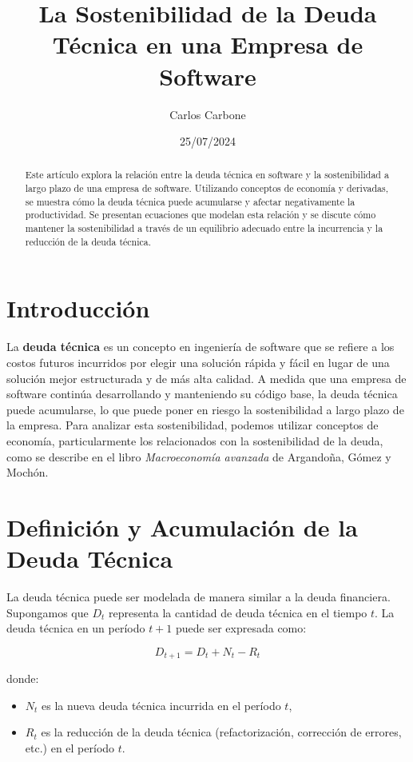 \documentclass[12pt]{article}
\title{La Sostenibilidad de la Deuda Técnica en una Empresa de Software}
\author{Carlos Carbone}
\date{25/07/2024}
\begin{document}
\maketitle

\begin{abstract}
Este artículo explora la relación entre la deuda técnica en software y la sostenibilidad a largo plazo de una empresa de software. Utilizando conceptos de economía y derivadas, se muestra cómo la deuda técnica puede acumularse y afectar negativamente la productividad. Se presentan ecuaciones que modelan esta relación y se discute cómo mantener la sostenibilidad a través de un equilibrio adecuado entre la incurrencia y la reducción de la deuda técnica.
\end{abstract}

\section{Introducción}
La \textbf{deuda técnica} es un concepto en ingeniería de software que se refiere a los costos futuros incurridos por elegir una solución rápida y fácil en lugar de una solución mejor estructurada y de más alta calidad. A medida que una empresa de software continúa desarrollando y manteniendo su código base, la deuda técnica puede acumularse, lo que puede poner en riesgo la sostenibilidad a largo plazo de la empresa. Para analizar esta sostenibilidad, podemos utilizar conceptos de economía, particularmente los relacionados con la sostenibilidad de la deuda, como se describe en el libro \textit{Macroeconomía avanzada} de Argandoña, Gómez y Mochón.

\section{Definición y Acumulación de la Deuda Técnica}
La deuda técnica puede ser modelada de manera similar a la deuda financiera. Supongamos que \(D_t\) representa la cantidad de deuda técnica en el tiempo \(t\). La deuda técnica en un período \(t+1\) puede ser expresada como:

\[
D_{t+1} = D_t + N_t - R_t
\]

donde:
\begin{itemize}
    \item \(N_t\) es la nueva deuda técnica incurrida en el período \(t\),
    \item \(R_t\) es la reducción de la deuda técnica (refactorización, corrección de errores, etc.) en el período \(t\).
\end{itemize}
\end{document}
